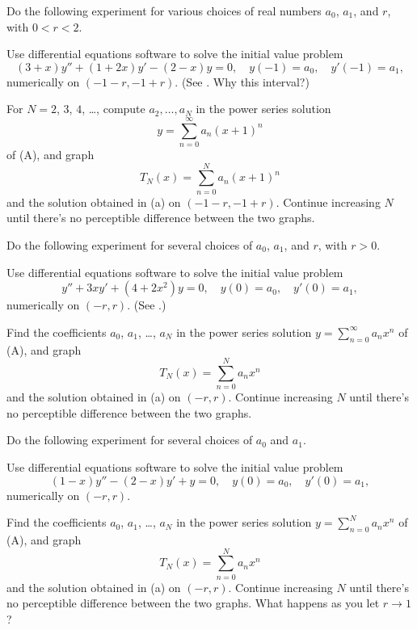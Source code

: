 \begin{exerciselist}
\item\label{exer:7.3.14}\Lex
Do the following experiment for various choices of
real numbers  $a_0$, $a_1$, and $r$, with $0<r<2$.
\begin{alist}
\item %
Use  differential equations software  to solve the initial
value problem
\[
(3+x)y''+(1+2x)y'-(2-x)y=0,\quad y(-1)=a_0,\quad y'(-1)=a_1,\tag{A}
\]
numerically on $(-1-r,-1+r)$.  (See . Why this
interval?)
\item %
For $N=2$, $3$, $4$, \dots, compute $a_2,\dots,a_N$ in the power series
solution
\[
y=\sum_{n=0}^\infty a_n(x+1)^n
\]
 of (A), and graph
\[
T_N(x)=\sum_{n=0}^N a_n(x+1)^n
\]
and the solution obtained in (a) on $(-1-r,-1+r)$.
Continue increasing $N$ until there's no perceptible
difference between the two graphs.
\end{alist}

\item\label{exer:7.3.15}\Lex
Do the following experiment for several choices of $a_0$,
 $a_1$, and $r$, with $r>0$.
\begin{alist}
\item %
Use  differential equations software to solve the initial
value problem
\[
y''+3xy'+(4+2x^2)y=0,\quad y(0)=a_0,\quad y'(0)=a_1,\tag{A}
\]
numerically on $(-r,r)$. (See .)
\item %
Find the coefficients $a_0$, $a_1$, \dots, $a_N$
in the power series solution $y=\sum_{n=0}^\infty a_nx^n$ of (A), and
graph
\[
T_N(x)=\sum_{n=0}^N a_nx^n
\]
and the solution obtained in (a) on $(-r,r)$.
Continue increasing $N$ until there's no perceptible
difference between the two graphs.
\end{alist}

\item\label{exer:7.3.16}\Lex
Do the following experiment for several choices of $a_0$
and $a_1$.
\begin{alist}
\item %
Use differential equations software  to solve the initial
value problem
\[
(1-x)y''-(2-x)y'+y=0,\quad y(0)=a_0,\quad y'(0)=a_1,\tag{A}
\]
numerically on $(-r,r)$.
\item %
Find the coefficients $a_0$, $a_1$, \dots, $a_N$
in the power series solution $y=\sum_{n=0}^Na_nx^n$ of (A), and graph
\[
T_N(x)=\sum_{n=0}^N a_nx^n
\]
and the solution obtained in (a) on $(-r,r)$.
Continue increasing $N$ until there's no perceptible
difference between the two graphs. What happens as you let $r\to1$?
\end{alist}



\end{exerciselist}
